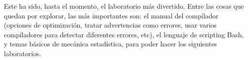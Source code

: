 \documentclass[a4paper,12pt]{article}
\begin{document}
Este ha sido, hasta el momento, el laboratorio más divertido. Entre las cosas que quedan por explorar, las más importantes son: el manual del compilador (opciones de optimización, tratar advertencias como errores, usar varios compiladores para detectar diferentes errores, etc), el lenguaje de scripting Bash, y temas básicos de mecánica estadística, para poder hacer los siguientes laboratorios.

%



\end{document}
